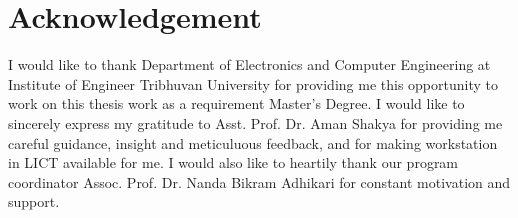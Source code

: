 \chapter*{Acknowledgement}
I would like to thank Department of Electronics and Computer Engineering at
Institute of Engineer Tribhuvan University for providing me this opportunity to
work on this thesis work as a requirement Master’s Degree. I would like to
sincerely express my gratitude to Asst. Prof. Dr. Aman Shakya for providing me
careful guidance, insight and meticuluous feedback, and for making workstation
in LICT available for me.  I would also like to heartily thank our program
coordinator Assoc. Prof. Dr.  Nanda Bikram Adhikari for constant motivation and
support.
